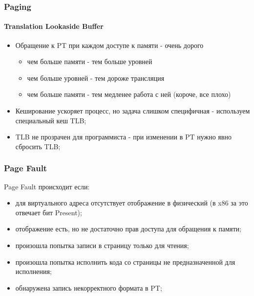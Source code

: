 \begin{frame}
\frametitle{Paging}
\framesubtitle{Translation Lookaside Buffer}

\begin{itemize}
  \item<1-> Обращение к PT при каждом доступе к памяти - очень дорого
    \begin{itemize}
      \item чем больше памяти - тем больше уровней
      \item чем больше уровней - тем дороже трансляция
      \item чем больше памяти - тем медленее работа с ней (короче, все плохо)
    \end{itemize}
  \item<2-> Кеширование ускоряет процесс, но задача слишком специфичная - используем специальный кеш TLB;
  \item<3-> TLB не прозрачен для программиста - при изменении в PT нужно явно сбросить TLB;
\end{itemize}
\end{frame}

\begin{frame}
\frametitle{Page Fault}

Page Fault происходит если:
\begin{itemize}
  \item для виртуального адреса отсутствует отображение в физический (в x86 за это отвечает бит Present);
  \item отображение есть, но не достаточно прав доступа для обращения к памяти;
  \item произошла попытка записи в страницу только для чтения;
  \item произошла попытка исполнить кода со страницы не предназначенной для исполнения;
  \item обнаружена запись некорректного формата в PT;
\end{itemize}


\end{frame}

